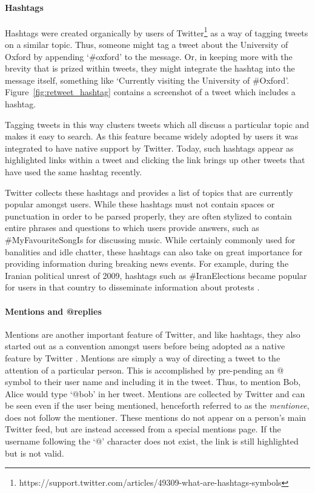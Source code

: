 \paragraph{Hashtags}

Hashtags were created organically by users of Twitter\footnote{https://support.twitter.com/articles/49309-what-are-hashtags-symbols} as a way of tagging tweets on a similar topic. Thus, someone might tag a tweet about the University of Oxford by appending `\#oxford' to the message. Or, in keeping more with the brevity that is prized within tweets, they might integrate the hashtag into the message itself, something like `Currently visiting the University of \#Oxford'. Figure~\ref{fig:retweet_hashtag} contains a screenshot of a tweet which includes a hashtag.

Tagging tweets in this way clusters tweets which all discuss a particular topic and makes it easy to search. As this feature became widely adopted by users it was integrated to have native support by Twitter. Today, such hashtags appear as highlighted links within a tweet and clicking the link brings up other tweets that have used the same hashtag recently.

Twitter collects these hashtags and provides a list of topics that are currently popular amongst users. While these hashtags must not contain spaces or punctuation in order to be parsed properly, they are often stylized to contain entire phrases and questions to which users provide answers, such as \#MyFavouriteSongIs for discussing music. While certainly commonly used for banalities and idle chatter, these hashtags can also take on great importance for providing information during breaking news events. For example, during the Iranian political unrest of 2009, hashtags such as \#IranElections became popular for users in that country to disseminate information about protests \cite{Cha2010}.


\paragraph{Mentions and @replies}

Mentions are another important feature of Twitter, and like hashtags, they also started out as a convention amongst users before being adopted as a native feature by Twitter \cite{Java2007}. Mentions are simply a way of directing a tweet to the attention of a particular person. This is accomplished by pre-pending an @ symbol to their user name and including it in the tweet. Thus, to mention Bob, Alice would type `@bob' in her tweet. Mentions are collected by Twitter and can be seen even if the user being mentioned, henceforth referred to as the \emph{mentionee}, does not follow the mentioner. These mentions do not appear on a person's main Twitter feed, but are instead accessed from a special mentions page. If the username following the `@' character does not exist, the link is still highlighted but is not valid.


